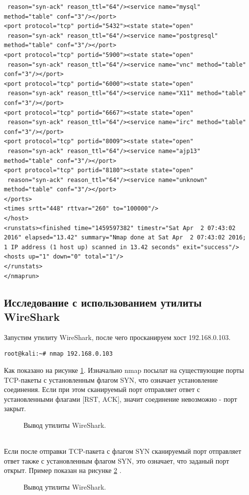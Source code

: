 \documentclass[10pt,a4paper]{report}
\begin{document}
\begin{verbatim}
 reason="syn-ack" reason_ttl="64"/><service name="mysql" method="table" conf="3"/></port>
<port protocol="tcp" portid="5432"><state state="open"
 reason="syn-ack" reason_ttl="64"/><service name="postgresql" method="table" conf="3"/></port>
<port protocol="tcp" portid="5900"><state state="open"
 reason="syn-ack" reason_ttl="64"/><service name="vnc" method="table" conf="3"/></port>
<port protocol="tcp" portid="6000"><state state="open"
 reason="syn-ack" reason_ttl="64"/><service name="X11" method="table" conf="3"/></port>
<port protocol="tcp" portid="6667"><state state="open"
 reason="syn-ack" reason_ttl="64"/><service name="irc" method="table" conf="3"/></port>
<port protocol="tcp" portid="8009"><state state="open"
 reason="syn-ack" reason_ttl="64"/><service name="ajp13" method="table" conf="3"/></port>
<port protocol="tcp" portid="8180"><state state="open"
 reason="syn-ack" reason_ttl="64"/><service name="unknown" method="table" conf="3"/></port>
</ports>
<times srtt="448" rttvar="260" to="100000"/>
</host>
<runstats><finished time="1459597382" timestr="Sat Apr  2 07:43:02 2016" elapsed="13.42" summary="Nmap done at Sat Apr  2 07:43:02 2016; 1 IP address (1 host up) scanned in 13.42 seconds" exit="success"/><hosts up="1" down="0" total="1"/>
</runstats>
</nmaprun>
\end{verbatim}
\subsection{Исследование с использованием утилиты WireShark}
Запустим утилиту WireShark, после чего просканируем хост 192.168.0.103.
\begin{verbatim}
root@kali:~# nmap 192.168.0.103
\end{verbatim}
Как показано на рисунке \ref{ris:image1}. Изначально nmap посылат на существующие порты TCP-пакеты с установленным флагом SYN, что означает установление соединения. Если при этом сканируемый порт отправляет ответ с установленными флагами [RST, ACK], значит соединение невозможно - порт закрыт.  \\
\begin{figure}[ht]	
\caption{Вывод утилиты WireShark.}\label{ris:image1}
\end{figure} \\
Если после отправки TCP-пакета с флагом SYN сканируемый порт отправляет ответ также с установленным флагом SYN, это означает, что заданый порт открыт. Пример показан на рисунке \ref{ris:image2} .  
\begin{figure}[ht]	
\caption{Вывод утилиты WireShark.}\label{ris:image2}
\end{figure}
\end{document}
